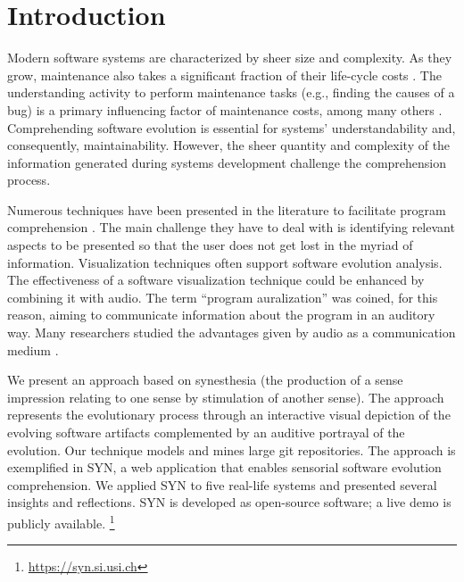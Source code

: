 \documentclass[11pt,twoside,english,singlespacing,headsepline,consistentlayout]{auxiliary/si-msc-thesis}
\author{Gianlorenzo Occhipinti}
\newcommand{\quotes}[1]{``#1''}
\begin{document}
\frontmatter
\pagestyle{plain}




\mainmatter
 
\pagestyle{thesis} 



\section*{Introduction}
Modern software systems are characterized by sheer size and complexity. As they grow, maintenance also takes a significant fraction of their life-cycle costs \cite{Davis1995, Sommerville1995, Erlikh2000, seacord2003}. The understanding activity to perform maintenance tasks (e.g., finding the causes of a bug) is a primary influencing factor of maintenance costs, among many others \cite{Corbi1989}.
Comprehending software evolution is essential for systems' understandability and, consequently, maintainability. However, the sheer quantity and complexity of the information generated during systems development challenge the comprehension process.

Numerous techniques have been presented in the literature to facilitate program comprehension \cite{Lanza2001, DAmbros2006, Steinbrueckner2010, Wettel2011, Alexandru2019, SoftwareEvolution}. The main challenge they have to deal with is identifying relevant aspects to be presented so that the user does not get lost in the myriad of information. Visualization techniques often support software evolution analysis.
The effectiveness of a software visualization technique could be enhanced by combining it with audio. The term \quotes{program auralization} was coined, for this reason, aiming to communicate information about the program in an auditory way.
Many researchers studied the advantages given by audio as a communication medium \cite{Alty1995}.

We present an approach based on synesthesia (the production of a sense impression relating to one sense by stimulation of another sense). The approach represents the evolutionary process through an interactive visual depiction of the evolving software artifacts complemented by an auditive portrayal of the evolution. Our technique models and mines large git repositories.
The approach is exemplified in SYN, a web application that enables sensorial software evolution comprehension.
We applied SYN to five real-life systems and presented several insights and reflections. SYN is developed as open-source software; a live demo is publicly available. \footnote{\url{https://syn.si.usi.ch}}
\end{document}
